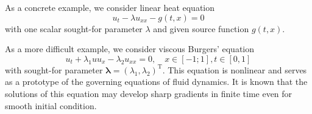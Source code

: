 \documentclass[a4paper, 12pt, english, parskip]{scrartcl}
\newcommand{\MSE}{\ensuremath{\text{MSE}}}
\newcommand{\T}{\ensuremath{\text{T}}}
\renewcommand{\vec}[1]{\boldsymbol{#1}}
\newcommand{\VLambda}{\ensuremath{\vec{\lambda}}}
\begin{document}

As a concrete example, we consider linear heat equation
\begin{equation}
    u_t - \lambda u_{xx} - g(t, x) = 0
\end{equation}
with one scalar sought-for parameter \(\lambda\) and given source function
\(g(t, x) \).

As a more difficult example, we consider viscous Burgers’ equation    
\begin{equation}
    u_t + \lambda_1 u u_x - \lambda_2 u_{xx} = 0, \quad x\in[-1; 1], t\in[0, 1]
\end{equation}
with sought-for parameter \( \VLambda = \left( \lambda_1, \lambda_2 \right)^\T \).
This equation is nonlinear and serves as a prototype of the governing
equations of fluid dynamics. It is known that the solutions of this equation
may develop sharp gradients in finite time even for smooth initial condition.



\end{document}
